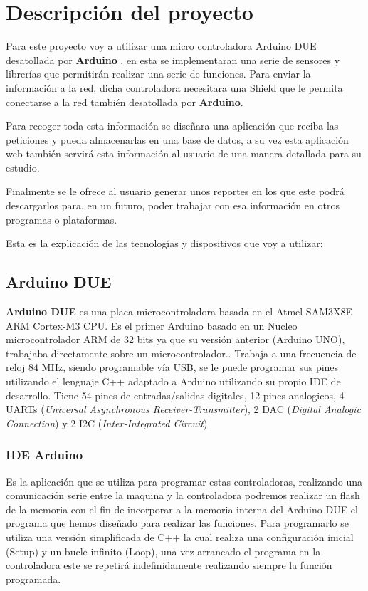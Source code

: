 \chapter{Descripción del proyecto}

Para este proyecto voy a utilizar una micro controladora Arduino DUE desatollada por \textbf{Arduino} , en esta se implementaran una serie de sensores y librerías que permitirán realizar una serie de funciones. Para enviar la información a la red, dicha controladora necesitara una Shield que le permita conectarse a la red también desatollada por \textbf{Arduino}.

Para recoger toda esta información se diseñara una aplicación que reciba las peticiones y pueda almacenarlas en una base de datos, a su vez esta aplicación web también servirá esta información al usuario de una manera detallada para su estudio.

Finalmente se le ofrece al usuario generar unos reportes en los que este podrá descargarlos para, en un futuro, poder trabajar con esa información en otros programas o plataformas.

Esta es la explicación de las tecnologías y dispositivos que voy a utilizar:

\section{Arduino DUE}

\textbf{Arduino DUE }es una placa microcontroladora basada en el Atmel SAM3X8E ARM Cortex-M3 CPU. Es el primer Arduino basado en un Nucleo microcontrolador ARM de 32 bits ya que su versión anterior (Arduino UNO), trabajaba directamente sobre un microcontrolador.. Trabaja a una frecuencia de reloj 84 MHz, siendo programable vía USB, se le puede programar sus pines utilizando el lenguaje C++ adaptado a Arduino utilizando su propio IDE de desarrollo.
Tiene 54 pines de entradas/salidas digitales, 12 pines analogicos, 4 UARTs (\textit{Universal Asynchronous Receiver-Transmitter}), 2 DAC (\textit{Digital Analogic Connection}) y 2 I2C (\textit{Inter-Integrated Circuit})

\subsection{IDE Arduino}

Es la aplicación que se utiliza para programar estas controladoras, realizando una comunicación serie entre la maquina y la controladora podremos realizar un flash de la memoria con el fin de incorporar a la memoria interna del Arduino DUE el programa que hemos diseñado para realizar las funciones. 
Para programarlo se utiliza una versión simplificada de C++ la cual realiza una configuración inicial (Setup) y un bucle infinito (Loop), una vez arrancado el programa en la controladora este se repetirá indefinidamente realizando siempre la función programada. 

